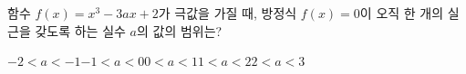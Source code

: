 함수 $f(x)=x^3-3ax+2$가 극값을 가질 때, 방정식 $f(x)=0$이 오직 한 개의 실근을 갖도록 하는 실수 $a$의 값의 범위는?
\begin{choicesii}{$-2<a<-1$}{$-1<a<0$}{$0<a<1$}{$1<a<2$}{$2<a<3$}\end{choicesii}
